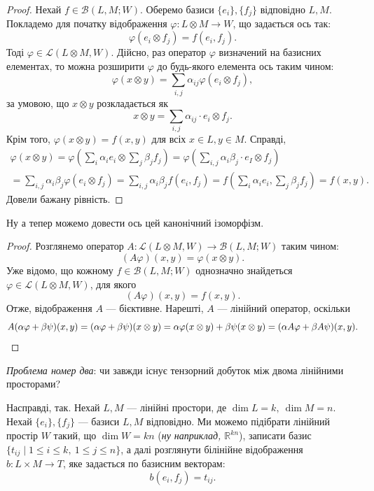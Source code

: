 \documentclass{math_library}
\begin{document}
\begin{proof}
Нехай $f \in \mathcal{B}(L,M; W)$. Оберемо базиси $\{e_i\}, \{f_j\}$ відповідно $L,M$. Покладемо для початку відображення $\varphi \colon L \otimes M \to W$, що задається ось так: 
\[
\varphi(e_i \otimes f_j) = f(e_i,f_j).
\]
Тоді $\varphi \in \mathcal{L}(L \otimes M, W)$. Дійсно, раз оператор $\varphi$ визначений на базисних елементах, то можна розширити $\varphi$ до будь-якого елемента ось таким чином: 
\[
\varphi(x \otimes y) = \displaystyle\sum_{i,j} \alpha_{ij} \varphi(e_i \otimes f_j),
\]
за умовою, що $x \otimes y$ розкладається як
\[
x \otimes y = \displaystyle\sum_{i,j} \alpha_{ij} \cdot e_i \otimes f_j.
\]
Крім того, $\varphi(x \otimes y) = f(x,y)$ для всіх $x \in L, y \in M$. Справді,
\begin{align*}
\varphi(x \otimes y) = \displaystyle\varphi\left( \sum_i \alpha_i e_i \otimes \sum_j \beta_j f_j\right) = \varphi\left( \sum_{i,j} \alpha_i \beta_j \cdot e_I \otimes f_j\right) \\
= \sum_{i,j} \alpha_i \beta_j \varphi(e_i \otimes f_j) = \sum_{i,j} \alpha_i \beta_j f(e_i,f_j) = f\left( \sum_i \alpha_i e_i, \sum_j \beta_j f_j\right) = f(x,y).
\end{align*}
Довели бажану рівність.
\end{proof}

Ну а тепер можемо довести ось цей канонічний ізоморфізм.

\begin{proof}
Розглянемо оператор $A \colon \mathcal{L}(L \otimes M, W) \to \mathcal{B}(L,M;W)$ таким чином:
\[ 
(A\varphi)(x,y) = \varphi(x \otimes y).
\]
Уже відомо, що кожному $f \in \mathcal{B}(L,M;W)$ однозначно знайдеться $\varphi \in \mathcal{L}(L \otimes M,W)$, для якого 
\[
(A \varphi)(x,y) = f(x,y).
\] Отже, відображення $A$ --- бієктивне. Нарешті, $A$ --- лінійний оператор, оскільки 
\[
A(\alpha \varphi + \beta \psi)(x,y) = (\alpha \varphi + \beta \psi)(x \otimes y) = \alpha \varphi(x \otimes y) + \beta \psi(x \otimes y) = (\alpha A\varphi + \beta A \psi)(x,y). \qedhere
\]
\end{proof}

\begin{remark}
\textit{Проблема номер два}: чи завжди існує тензорний добуток між двома лінійними просторами?
\end{remark}

Насправді, так. Нехай $L,M$ --- лінійні простори, де $\dim L = k,\ \dim M = n$. Нехай $\{e_i\},\{f_j\}$ --- базиси $L,M$ відповідно. Ми можемо підібрати лінійний простір $W$ такий, що $\dim W = kn$ (\textit{ну наприклад, $\mathbb{R}^{kn}$}), записати базис $\{t_{ij} \mid 1 \leq i \leq k,\ 1 \leq j \leq n\}$, а далі розглянути білінійне відображення $b \colon L \times M \to T$, яке задається по базисним векторам:
\[
b(e_i,f_j) = t_{ij}.
\]
\end{document}
